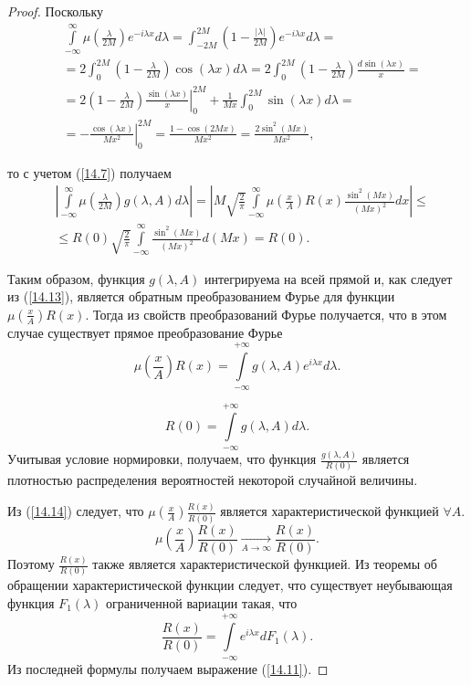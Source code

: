 \begin{proof}
 Поскольку
    $$
    \begin{aligned}
    & \int\limits_{-\infty}^{\infty} \mu\left(\frac{\lambda}{2 M}\right) e^{-i \lambda x} d \lambda=\int_{-2 M}^{2 M}\left(1-\frac{|\lambda|}{2 M}\right) e^{-i \lambda x} d \lambda= \\
    & =  2 \int_0^{2 M}\left(1-\frac{\lambda}{2 M}\right) \cos (\lambda x) d \lambda=2 \int_0^{2 M}\left(1-\frac{\lambda}{2 M}\right) \frac{d \sin (\lambda x)}{x}= \\
    & =\left.2\left(1-\frac{\lambda}{2 M}\right) \frac{\sin (\lambda x)}{x}\right|_0 ^{2 M}+\frac{1}{M x} \int_0^{2 M} \sin (\lambda x) d \lambda= \\
    & =-\left.\frac{\cos (\lambda x)}{M x^2}\right|_0 ^{2 M}=\frac{1-\cos (2 M x)}{M x^2}=\frac{2 \sin ^2(M x)}{M x^2},
    \end{aligned}
    $$
 
    то с учетом (\ref{14.7}) получаем
    $$
    \begin{aligned}
    & \left|\int\limits_{-\infty}^{\infty} \mu\left(\frac{\lambda}{2 M}\right) g(\lambda, A) d \lambda\right|=\left|M \sqrt{\frac{2}{\pi}} \int\limits_{-\infty}^{\infty} \mu\left(\frac{x}{A}\right) R(x) \frac{\sin ^2(M x)}{(M x)^2} d x\right| \leq \\
    & \leq R(0) \sqrt{\frac{2}{\pi}} \int\limits_{-\infty}^{\infty} \frac{\sin ^2(M x)}{(M x)^2} d(M x)=R(0) .
    \end{aligned}
    $$
    
    Таким образом, функция $g(\lambda, A)$ интегрируема на всей прямой и, как следует из (\ref{14.13}), является обратным преобразованием Фурье для функции $\mu\left(\frac{x}{A}\right) R(x)$. 
   \newline Тогда из свойств преобразований Фурье получается, что в этом случае существует прямое преобразование Фурье
    \begin{equation}
        \mu\left(\frac{x}{A}\right) R(x)=\int\limits_{-\infty}^{+\infty} g(\lambda, A) e^{i \lambda x} d \lambda .
    \label{14.14}
    \end{equation}

    $$
    R(0)=\int\limits_{-\infty}^{+\infty} g(\lambda, A) d \lambda .
    $$
    Учитывая условие нормировки, получаем, что функция $\frac{g(\lambda, A)}{R(0)}$ является плотностью распределения вероятностей некоторой случайной величины.
    
    Из (\ref{14.14}) следует, что $\mu\left(\frac{x}{A}\right) \frac{R(x)}{R(0)}$ является характеристической функцией $\forall A$.
    $$
        \mu\left(\frac{x}{A}\right) \frac{R(x)}{R(0)} 
        \xrightarrow[A \rightarrow \infty]{} \frac{R(x)}{R(0)}.
    $$    
    Поэтому $\frac{R(x)}{R(0)}$ также является характеристической функцией.
    Из теоремы об обращении характеристической функции следует, что существует неубывающая функция $F_1(\lambda)$ ограниченной вариации такая, что
    $$
    \frac{R(x)}{R(0)}=\int\limits_{-\infty}^{+\infty} e^{i \lambda x} d F_1(\lambda).
    $$
    Из последней формулы получаем выражение (\ref{14.11}).
    \end{proof}

